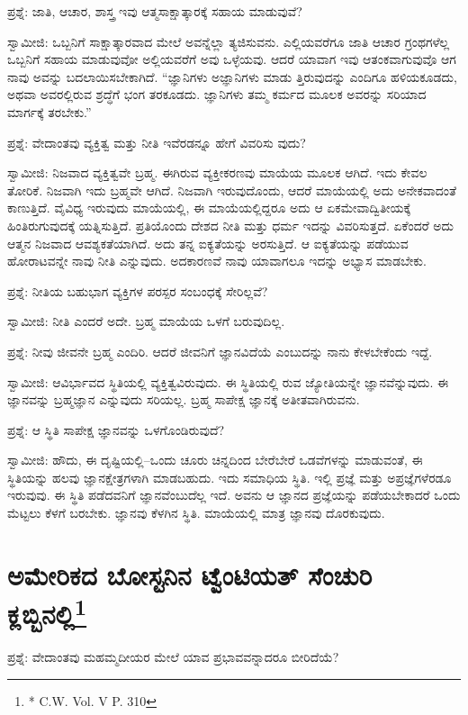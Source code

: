 ಪ್ರಶ್ನೆ: ಜಾತಿ, ಆಚಾರ, ಶಾಸ್ತ್ರ ಇವು ಆತ್ಮಸಾಕ್ಷಾತ್ಕಾರಕ್ಕೆ ಸಹಾಯ ಮಾಡುವುವೆ?

ಸ್ವಾಮೀಜಿ: ಒಬ್ಬನಿಗೆ ಸಾಕ್ಷಾತ್ಕಾರವಾದ ಮೇಲೆ ಅವನ್ನೆಲ್ಲಾ ತ್ಯಜಿಸುವನು. ಎಲ್ಲಿಯವರೆಗೂ ಜಾತಿ ಆಚಾರ ಗ್ರಂಥಗಳೆಲ್ಲ ಒಬ್ಬನಿಗೆ ಸಹಾಯ ಮಾಡುವುವೋ ಅಲ್ಲಿಯವರೆಗೆ ಅವು ಒಳ್ಳೆಯವು. ಆದರೆ ಯಾವಾಗ ಇವು ಆತಂಕವಾಗುವುವೊ ಆಗ ನಾವು ಅವನ್ನು ಬದಲಾಯಿಸಬೇಕಾಗಿದೆ. “ಜ್ಞಾನಿಗಳು ಅಜ್ಞಾನಿಗಳು ಮಾಡು ತ್ತಿರುವುದನ್ನು ಎಂದಿಗೂ ಹಳಿಯಕೂಡದು, ಅಥವಾ ಅವರಲ್ಲಿರುವ ಶ್ರದ್ಧೆಗೆ ಭಂಗ ತರಕೂಡದು. ಜ್ಞಾನಿಗಳು ತಮ್ಮ ಕರ್ಮದ ಮೂಲಕ ಅವರನ್ನು ಸರಿಯಾದ ಮಾರ್ಗಕ್ಕೆ ತರಬೇಕು.”

ಪ್ರಶ್ನೆ: ವೇದಾಂತವು ವ್ಯಕ್ತಿತ್ವ ಮತ್ತು ನೀತಿ ಇವೆರಡನ್ನೂ ಹೇಗೆ ವಿವರಿಸು ವುದು?

ಸ್ವಾಮೀಜಿ: ನಿಜವಾದ ವ್ಯಕ್ತಿತ್ವವೇ ಬ್ರಹ್ಮ. ಈಗಿರುವ ವ್ಯಕ್ತೀಕರಣವು ಮಾಯೆಯ ಮೂಲಕ ಆಗಿದೆ. ಇದು ಕೇವಲ ತೋರಿಕೆ. ನಿಜವಾಗಿ ಇದು ಬ್ರಹ್ಮವೇ ಆಗಿದೆ. ನಿಜವಾಗಿ ಇರುವುದೊಂದು, ಆದರೆ ಮಾಯೆಯಲ್ಲಿ ಅದು ಅನೇಕವಾದಂತೆ ಕಾಣುತ್ತಿದೆ. ವೈವಿಧ್ಯ ಇರುವುದು ಮಾಯೆಯಲ್ಲಿ, ಈ ಮಾಯೆಯಲ್ಲಿದ್ದರೂ ಅದು ಆ ಏಕಮೇವಾದ್ವಿತೀಯಕ್ಕೆ ಹಿಂತಿರುಗುವುದಕ್ಕೆ ಯತ್ನಿಸುತ್ತಿದೆ. ಪ್ರತಿಯೊಂದು ದೇಶದ ನೀತಿ ಮತ್ತು ಧರ್ಮ ಇದನ್ನು ವಿವರಿಸುತ್ತದೆ. ಏಕೆಂದರೆ ಅದು ಆತ್ಮನ ನಿಜವಾದ ಆವಶ್ಯಕತೆಯಾಗಿದೆ. ಅದು ತನ್ನ ಐಕ್ಯತೆಯನ್ನು ಅರಸುತ್ತಿದೆ. ಆ ಐಕ್ಯತೆಯನ್ನು ಪಡೆಯುವ ಹೋರಾಟವನ್ನೇ ನಾವು ನೀತಿ ಎನ್ನುವುದು. ಅದಕಾರಣವೆ ನಾವು ಯಾವಾಗಲೂ ಇದನ್ನು ಅಭ್ಯಾಸ ಮಾಡಬೇಕು.

ಪ್ರಶ್ನೆ: ನೀತಿಯ ಬಹುಭಾಗ ವ್ಯಕ್ತಿಗಳ ಪರಸ್ಪರ ಸಂಬಂಧಕ್ಕೆ ಸೇರಿಲ್ಲವೆ?

ಸ್ವಾಮೀಜಿ: ನೀತಿ ಎಂದರೆ ಅದೇ. ಬ್ರಹ್ಮ ಮಾಯೆಯ ಒಳಗೆ ಬರುವುದಿಲ್ಲ.

ಪ್ರಶ್ನೆ: ನೀವು ಜೀವನೇ ಬ್ರಹ್ಮ ಎಂದಿರಿ. ಆದರೆ ಜೀವನಿಗೆ ಜ್ಞಾನವಿದೆಯೆ ಎಂಬುದನ್ನು ನಾನು ಕೇಳಬೇಕೆಂದು ಇದ್ದೆ.

ಸ್ವಾಮೀಜಿ: ಆವಿರ್ಭಾವದ ಸ್ಥಿತಿಯಲ್ಲಿ ವ್ಯಕ್ತಿತ್ವವಿರುವುದು. ಈ ಸ್ಥಿತಿಯಲ್ಲಿ ರುವ ಜ್ಯೋತಿಯನ್ನೇ ಜ್ಞಾನವೆನ್ನುವುದು. ಈ ಜ್ಞಾನವನ್ನು ಬ್ರಹ್ಮಜ್ಞಾನ ಎನ್ನುವುದು ಸರಿಯಲ್ಲ. ಬ್ರಹ್ಮ ಸಾಪೇಕ್ಷ ಜ್ಞಾನಕ್ಕೆ ಅತೀತವಾಗಿರುವನು.

ಪ್ರಶ್ನೆ: ಆ ಸ್ಥಿತಿ ಸಾಪೇಕ್ಷ ಜ್ಞಾನವನ್ನು ಒಳಗೊಂಡಿರುವುದೆ?

ಸ್ವಾಮೀಜಿ: ಹೌದು, ಈ ದೃಷ್ಟಿಯಲ್ಲಿ–ಒಂದು ಚೂರು ಚಿನ್ನದಿಂದ ಬೇರೆಬೇರೆ ಒಡವೆಗಳನ್ನು ಮಾಡುವಂತೆ, ಈ ಸ್ಥಿತಿಯನ್ನು ಹಲವು ಜ್ಞಾನಕ್ಷೇತ್ರಗಳಾಗಿ ಮಾಡಬಹುದು. ಇದು ಸಮಾಧಿಯ ಸ್ಥಿತಿ. ಇಲ್ಲಿ ಪ್ರಜ್ಞೆ ಮತ್ತು ಅಪ್ರಜ್ಞೆಗಳೆರಡೂ ಇರುವುವು. ಈ ಸ್ಥಿತಿ ಪಡೆದವನಿಗೆ ಜ್ಞಾನವೆಂಬುದೆಲ್ಲ ಇದೆ. ಅವನು ಆ ಜ್ಞಾನದ ಪ್ರಜ್ಞೆಯನ್ನು ಪಡೆಯಬೇಕಾದರೆ ಒಂದು ಮೆಟ್ಟಲು ಕೆಳಗೆ ಬರಬೇಕು. ಜ್ಞಾನವು ಕೆಳಗಿನ ಸ್ಥಿತಿ. ಮಾಯೆಯಲ್ಲಿ ಮಾತ್ರ ಜ್ಞಾನವು ದೊರಕುವುದು.


\section[ಅಮೇರಿಕದ ಬೋಸ್ಟನಿನ ಟ್ವೆಂಟಿಯತ್ ಸೆಂಚುರಿ ಕ್ಲಬ್ಬಿನಲ್ಲಿ]{ಅಮೇರಿಕದ ಬೋಸ್ಟನಿನ ಟ್ವೆಂಟಿಯತ್ ಸೆಂಚುರಿ ಕ್ಲಬ್ಬಿನಲ್ಲಿ\protect\footnote{* C.W. Vol. V P. 310}}

ಪ್ರಶ್ನೆ: ವೇದಾಂತವು ಮಹಮ್ಮದೀಯರ ಮೇಲೆ ಯಾವ ಪ್ರಭಾವವನ್ನಾದರೂ ಬೀರಿದೆಯೆ?

